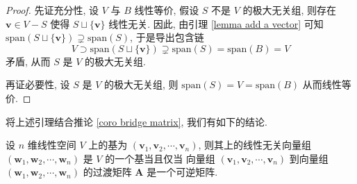 \documentclass[UTF8]{book}
\begin{document}
\begin{proof}
    先证充分性, 设 $V$ 与 $B$ 线性等价, 
    假设 $S$ 不是 $V$ 的极大无关组, 则存在 $\boldsymbol{v}\in V-S$ 
    使得 $S \sqcup \{\boldsymbol{v}\}$ 线性无关. 
    因此, 由引理 \ref{lemma add a vector} 可知 
    $\mathrm{span}(S \sqcup \{\boldsymbol{v}\}) \supsetneq 
    \mathrm{span}(S) $, 
    于是导出包含链 
    $$ V \supset \mathrm{span}(S \sqcup \{\boldsymbol{v}\}) \supsetneq 
    \mathrm{span}(S) = \mathrm{span}(B) = V$$
    矛盾, 从而 $S$ 是 $V$ 的极大无关组. 

    再证必要性, 设 $S$ 是 $V$ 的极大无关组, 
    则 $\mathrm{span}(S)=V=\mathrm{span}(B)$ 
    从而线性等价. 
\end{proof}

将上述引理结合推论 \ref{coro bridge matrix}, 我们有如下的结论. 

\begin{theorem}
    设 $n$ 维线性空间 $V$ 上的基为 
    $(\boldsymbol{v}_1,\boldsymbol{v}_2,\cdots,\boldsymbol{v}_n)$,  
    则其上的线性无关向量组 
    $(\boldsymbol{w}_1,\boldsymbol{w}_2,\cdots,\boldsymbol{w}_n)$
    是 $V$ 的一个基当且仅当
    向量组  $(\boldsymbol{v}_1,\boldsymbol{v}_2,\cdots,\boldsymbol{v}_n)$ 
    到向量组 $(\boldsymbol{w}_1,\boldsymbol{w}_2,\cdots,\boldsymbol{w}_n)$ 
    的过渡矩阵 $\boldsymbol{A}$ 是一个可逆矩阵. 
\end{theorem}
\end{document}
